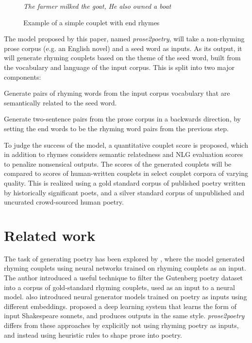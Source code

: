 \documentclass[11pt,a4paper]{article}
\newenvironment{tight_enumerate}{
\begin{enumerate}
\setlength{\itemsep}{0pt}
\setlength{\parskip}{0pt}
}{\end{enumerate}}
\begin{document}
\begin{figure}
	\textit{The farmer milked the goat,} \newline
	\textit{He also owned a boat}
\caption{Example of a simple couplet with end rhymes}
\label{fig:couplet_example}
\end{figure}

The model proposed by this paper, named \textit{prose2poetry}, will take a non-rhyming prose corpus (e.g. an English novel) and a seed word as inputs. As its output, it will generate rhyming couplets based on the theme of the seed word, built from the vocabulary and language of the input corpus. This is split into two major components:
\begin{tight_enumerate}
	\vspace{-0.5em}
	\item
		Generate pairs of rhyming words from the input corpus vocabulary that are semantically related to the seed word.
	\item
		Generate two-sentence pairs from the prose corpus in a backwards direction, by setting the end words to be the rhyming word pairs from the previous step.
\end{tight_enumerate}
\vspace{-0.5em}

To judge the success of the model, a quantitative couplet score is proposed, which in addition to rhymes considers semantic relatedness and NLG evaluation scores to penalize nonsensical outputs. The scores of the generated couplets will be compared to scores of human-written couplets in select couplet corpora of varying quality. This is realized using a gold standard corpus of published poetry written by historically significant poets, and a silver standard corpus of unpublished and uncurated crowd-sourced human poetry.

\section{Related work}
\label{sec:related}

The task of generating poetry has been explored by \citet{cole}, where the model generated rhyming couplets using neural networks trained on rhyming couplets as an input. The author introduced a useful technique to filter the Gutenberg poetry dataset \cite{gutenbergpoetry} into a corpus of gold-standard rhyming couplets, used as an input to a neural model. \citet{hopkins-kiela-2017} also introduced neural generator models trained on poetry as inputs using different embeddings. \citet{Xie2017DeepP} proposed a deep learning system that learns the form of input Shakespeare sonnets, and produces outputs in the same style. \textit{prose2poetry} differs from these approaches by explicitly not using rhyming poetry as inputs, and instead using heuristic rules to shape prose into poetry.
\end{document}
